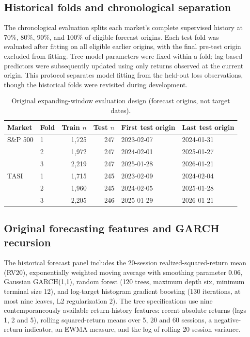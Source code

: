 \subsection{Historical folds and chronological separation}
The chronological evaluation splits each market's complete supervised history at 70\%, 80\%, 90\%, and 100\% of eligible forecast origins. Each test fold was evaluated after fitting on all eligible earlier origins, with the final pre-test origin excluded from fitting. Tree-model parameters were fixed within a fold; lag-based predictors were subsequently updated using only returns observed at the current origin. This protocol separates model fitting from the held-out loss observations, though the historical folds were revisited during development.
\begin{table}[ht]\centering\small
\caption{Original expanding-window evaluation design (forecast origins, not target dates).}
\begin{tabular}{llrrll}\toprule
Market & Fold & Train $n$ & Test $n$ & First test origin & Last test origin\\\midrule
S\&P 500 & 1 & 1,725 & 247 & 2023-02-07 & 2024-01-31\\
 & 2 & 1,972 & 247 & 2024-02-01 & 2025-01-27\\
 & 3 & 2,219 & 247 & 2025-01-28 & 2026-01-21\\
TASI & 1 & 1,715 & 245 & 2023-02-09 & 2024-02-04\\
 & 2 & 1,960 & 245 & 2024-02-05 & 2025-01-28\\
 & 3 & 2,205 & 246 & 2025-01-29 & 2026-01-21\\\bottomrule
\end{tabular}\end{table}

\subsection{Original forecasting features and GARCH recursion}
The historical forecast panel includes the 20-session realized-squared-return mean (RV20), exponentially weighted moving average with smoothing parameter $0.06$, Gaussian GARCH(1,1), random forest (120 trees, maximum depth six, minimum terminal size 12), and log-target histogram gradient boosting (130 iterations, at most nine leaves, L2 regularization 2). The tree specifications use nine contemporaneously available return-history features: recent absolute returns (lags 1, 2 and 5), rolling squared-return means over 5, 20 and 60 sessions, a negative-return indicator, an EWMA measure, and the log of rolling 20-session variance.

